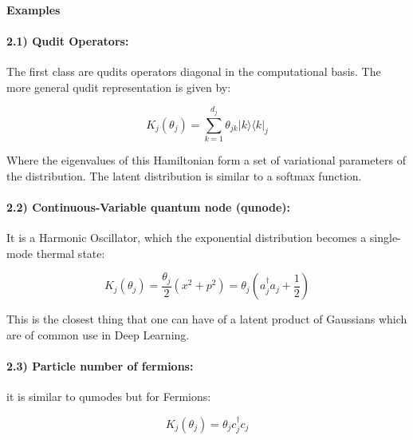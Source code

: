 \paragraph{Examples}
\paragraph{2.1) Qudit Operators:} The first class are qudits operators diagonal in the computational basis. The more general qudit representation is given by:

\begin{equation*}
    K_j ( \theta_j ) = \sum_{k=1}^{d_j} \theta_{jk} | k \rangle \langle k |_j
\end{equation*}

Where the eigenvalues of this Hamiltonian form a set of variational parameters of the distribution. The latent distribution is similar to a softmax function.

\paragraph{2.2) Continuous-Variable quantum node (qunode):} It is a Harmonic Oscillator, which the exponential distribution becomes a single-mode thermal state:

\begin{equation*}
    K_j ( \theta_j ) = \frac{\theta_j}{2} ( x^2 + p^2) = \theta_j ( a_j^\dagger a_j + \frac{1}{2} )
\end{equation*}

This is the closest thing that one can have of a latent product of Gaussians which are of common use in Deep Learning.

\paragraph{2.3) Particle number of fermions:} it is similar to qumodes but for Fermions:

\begin{equation*}
    K_j ( \theta_j ) = \theta_j c_j^\dagger c_j
\end{equation*}